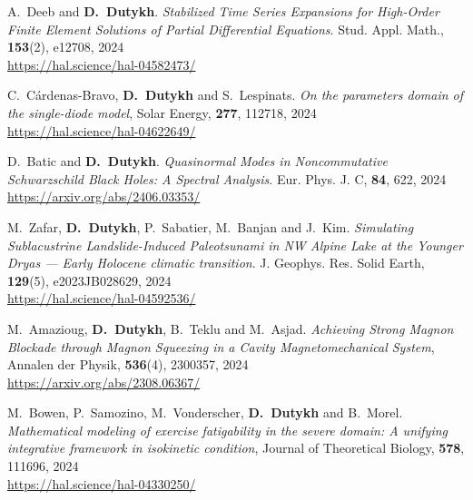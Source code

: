 \begin{etaremune}
  \item A.~Deeb and \textbf{D.~Dutykh}. \textit{Stabilized Time Series Expansions for High-Order Finite Element Solutions of Partial Differential Equations}. Stud. Appl. Math., \textbf{153}(2), e12708, 2024 \\ %
  \url{https://hal.science/hal-04582473/}
  
  \item C.~C\'ardenas-Bravo, \textbf{D.~Dutykh} and S.~Lespinats. \textit{On the parameters domain of the single-diode model}, Solar Energy, \textbf{277}, 112718, 2024 \\ %
  \url{https://hal.science/hal-04622649/}
  
  \item D.~Batic and \textbf{D.~Dutykh}. \textit{Quasinormal Modes in Noncommutative Schwarzschild Black Holes: A Spectral Analysis}. Eur. Phys. J. C, \textbf{84}, 622, 2024 \\ %
  \url{https://arxiv.org/abs/2406.03353/}

  \item M.~Zafar, \textbf{D.~Dutykh}, P.~Sabatier, M.~Banjan and J.~Kim. \textit{Simulating Sublacustrine Landslide-Induced Paleotsunami in NW Alpine Lake at the Younger Dryas --- Early Holocene climatic transition}. J. Geophys. Res. Solid Earth, \textbf{129}(5), e2023JB028629, 2024 \\ %
  \url{https://hal.science/hal-04592536/}
  
  \item M.~Amazioug, \textbf{D.~Dutykh}, B.~Teklu and M.~Asjad. \textit{Achieving Strong Magnon Blockade through Magnon Squeezing in a Cavity Magnetomechanical System}, Annalen der Physik, \textbf{536}(4), 2300357, 2024 \\ %
  \url{https://arxiv.org/abs/2308.06367/}
  
  \item M.~Bowen, P.~Samozino, M.~Vonderscher, \textbf{D.~Dutykh} and B.~Morel. \textit{Mathematical modeling of exercise fatigability in the severe domain: A unifying integrative framework in isokinetic condition}, Journal of Theoretical Biology, \textbf{578}, 111696, 2024 \\ %
  \url{https://hal.science/hal-04330250/}
  
  


\end{etaremune}
